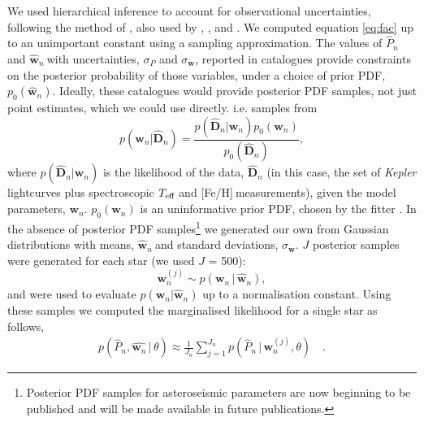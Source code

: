 \documentclass[useAMS, usenatbib]{mn2e}
\newcommand{\logg}{log \emph{g}}
\newcommand{\teff}{$T_{\rm{eff}}$}
\newcommand{\w}{\mathbf{w}}
\newcommand{\wh}{$\hat{\mathbf{w}}_n$}
\newcommand{\ph}{$\hat{P}_n$}
\newcommand{\feh}{[Fe/H]}
\begin{document}
We used hierarchical inference to account for observational uncertainties,
following the method of \citet{Hogg2010}, also used by
\citet{Foreman-Mackey2014}, \citet{Rogers2014}, \citet{Morton2014} and
\citet{Demory2014}.
We computed equation \ref{eq:fac} up to an unimportant constant
using a sampling approximation.
The values of \ph$~$and \wh$~$with uncertainties, $\sigma_P$ and
$\sigma_{\mathbf{w}}$, reported in catalogues provide constraints on the
posterior probability of those variables, under a choice of prior PDF,
$p_0(\hat{\mathbf{w}}_n)$.
Ideally, these catalogues would provide posterior PDF samples, not just point
estimates, which we could use directly.
i.e. samples from
\begin{equation}
	p(\mathbf{w}_n|\hat{\mathbf{D}}_n) =
	\frac{p(\hat{\mathbf{D}}_n|\mathbf{w}_n)p_0(\mathbf{w}_n)}
	{p_0(\hat{\mathbf{D}}_n)},
\end{equation}
where $p(\hat{\mathbf{D}}_n|\w_n)$ is the likelihood of the data,
$\hat{\mathbf{D}}_n$ (in this case,
the set of {\it Kepler} lightcurves plus spectroscopic \teff$~$and
\feh$~$measurements), given the model parameters, $\mathbf{w}_n$.
$p_0(\mathbf{w}_n)$ is an uninformative prior PDF, chosen by the
fitter \citep[][used a flat prior PDF in age and \logg]{Chaplin2014}.
In the absence of posterior PDF samples\footnote{Posterior PDF samples
for asteroseismic parameters are now beginning to be published and will be made
available in future publications.} we generated our own from Gaussian
distributions with means, \wh$~$and standard deviations, $\sigma_{\mathbf{w}}$.
$J$ posterior samples were generated for each star (we used $J$ = 500):
\begin{equation}
\w_n^{(j)} \sim p(\w_n\,|\,\hat{\w}_n),
\end{equation}
and were used to evaluate $p(\mathbf{w}_n|\hat{\mathbf{w}}_n)$ up to a
normalisation constant.
Using these samples we computed the marginalised likelihood for a single
star as follows,
\begin{align}
	p(\hat{P}_n,\hat{\w_n}\,|\,\theta) \approx \frac{1}{J_n}
	\sum_{j=1}^{J_n}p(\hat{P}_n\,|\,\mathbf{w}_n^{(j)},\theta) \quad.
\end{align}
\end{document}
